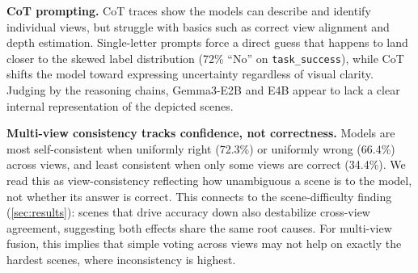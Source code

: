 \textbf{CoT prompting.}
CoT traces show the models can describe and identify individual views, but struggle with basics such as correct view alignment and depth estimation. Single-letter prompts force a direct guess that happens to land closer to the skewed label distribution (72\% ``No'' on \texttt{task\_success}), while CoT shifts the model toward expressing uncertainty regardless of visual clarity. Judging by the reasoning chains, Gemma3-E2B and E4B appear to lack a clear internal representation of the depicted scenes.

\textbf{Multi-view consistency tracks confidence, not correctness.} Models are most self-consistent when uniformly right (72.3\%) or uniformly wrong (66.4\%) across views, and least consistent when only some views are correct (34.4\%). We read this as
view-consistency reflecting how unambiguous a scene is to the model, not whether its
answer is correct. This connects to the scene-difficulty finding (\cref{sec:results}):
scenes that drive accuracy down also destabilize cross-view agreement, suggesting both
effects share the same root causes. For multi-view fusion, this implies that simple voting across views may not help on exactly the hardest scenes, where inconsistency is highest.
